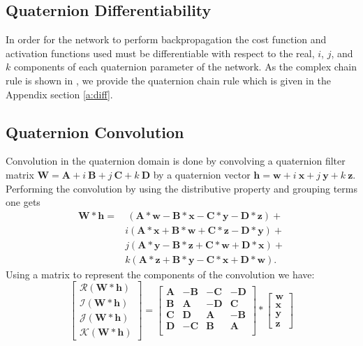 \subsection{Quaternion Differentiability}
In order for the network to perform backpropagation the cost function and activation functions used must be differentiable with respect to the real, $i$, $j$, and $k$ components of each quaternion parameter of the network.
As the complex chain rule is shown in \cite{trabelsi2017deep}, we provide the quaternion chain rule which is given in the Appendix section \ref{a:diff}.


\subsection{Quaternion Convolution}\label{s:qc}
Convolution in the quaternion domain is done by convolving a quaternion filter matrix $\textbf{W}=\textbf{A}+\textit{i}~\textbf{B}+\textit{j}~\textbf{C}+\textit{k}~\textbf{D}$ by a quaternion vector $\textbf{h}=\textbf{w}+\textit{i}~\textbf{x}+\textit{j}~\textbf{y}+\textit{k}~\textbf{z}$. 
Performing the convolution by using the distributive property and grouping terms one gets
\begin{align}
\textbf{W}\ast \textbf{h} = &~(\textbf{A}\ast\textbf{w}-\textbf{B}\ast\textbf{x}-\textbf{C}\ast\textbf{y}-\textbf{D}\ast\textbf{z}) + \nonumber \\ 
&\textit{i}(\textbf{A}\ast\textbf{x}+\textbf{B}\ast\textbf{w}+\textbf{C}\ast\textbf{z}-\textbf{D}\ast\textbf{y}) + \nonumber \\
&\textit{j}(\textbf{A}\ast\textbf{y}-\textbf{B}\ast\textbf{z}+\textbf{C}\ast\textbf{w}+\textbf{D}\ast\textbf{x}) + \nonumber \\
&\textit{k}(\textbf{A}\ast\textbf{z}+\textbf{B}\ast\textbf{y}-\textbf{C}\ast\textbf{x}+\textbf{D}\ast\textbf{w}).
\end{align}
Using a matrix to represent the components of the convolution we have:
\begin{equation}
\begin{bmatrix}
 \mathscr{R}(\textbf{W}\ast \textbf{h}) \\ 
 \mathscr{I}(\textbf{W}\ast \textbf{h}) \\
 \mathscr{J}(\textbf{W}\ast \textbf{h}) \\
 \mathscr{K}(\textbf{W}\ast \textbf{h}) 
\end{bmatrix}
=
\begin{bmatrix}
 \textbf{A} & -\textbf{B} & -\textbf{C} & -\textbf{D}\\
 \textbf{B} & \textbf{A} & -\textbf{D} & \textbf{C} \\
 \textbf{C} & \textbf{D} & \textbf{A} & -\textbf{B} \\
 \textbf{D} & -\textbf{C} & \textbf{B} & \textbf{A} \\
\end{bmatrix}
\ast
\begin{bmatrix}
 \textbf{w} \\ 
 \textbf{x} \\
 \textbf{y} \\
 \textbf{z}
\end{bmatrix}
\label{eq:qconvolve2}
\end{equation}


